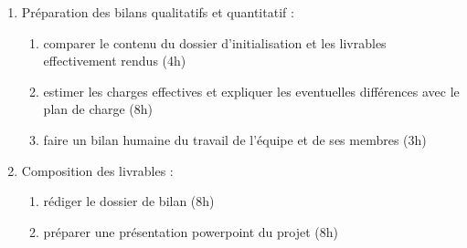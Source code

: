 \begin{enumerate}
          \begin{enumerate}
            \item Préparation des bilans qualitatifs et quantitatif :
                \begin{enumerate}
                  \item comparer le contenu du dossier d'initialisation et les livrables effectivement rendus (4h)
                  \item estimer les charges effectives et expliquer les eventuelles différences avec le plan de charge (8h)
                  \item faire un bilan humaine du travail de l'équipe et de ses membres (3h)
                \end{enumerate}
            \item Composition des livrables :
                \begin{enumerate}
                  \item rédiger le dossier de bilan (8h)
                  \item préparer une présentation powerpoint du projet (8h)
                \end{enumerate}
          \end{enumerate}

\end{enumerate}
